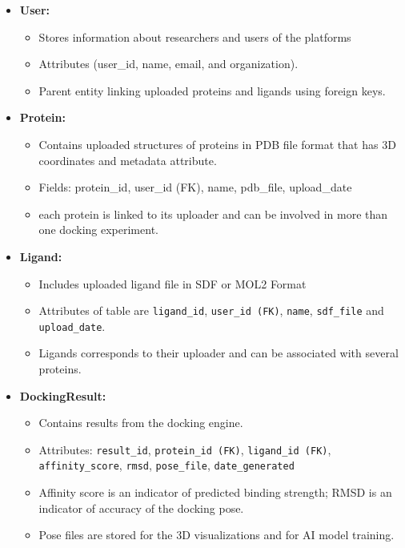 \documentclass[12pt,a4]{report}
\begin{document}
\vspace{0.4cm}
\begin{itemize}
\vspace{0.3cm}
\item \textbf{User:}
\begin{itemize}
\item Stores information about researchers and users of the platforms
\item Attributes (user\_id, name, email, and organization).
\item Parent entity linking uploaded proteins and ligands using foreign keys.
\end{itemize}

\item \textbf{Protein:}
\begin{itemize}
\item Contains uploaded structures of proteins in PDB file format that has 3D coordinates and metadata attribute.
\item Fields: protein\_id, user\_id (FK), name, pdb\_file, upload\_date
\item each protein is linked to its uploader and can be involved in more than one docking experiment.
\end{itemize}

\item \textbf{Ligand:}
\begin{itemize}
\item Includes uploaded ligand file in SDF or MOL2 Format
\item Attributes of table are \texttt{ligand\_id}, \texttt{user\_id (FK)}, \texttt{name}, \texttt{sdf\_file} and \texttt{upload\_date}.
\item Ligands corresponds to their uploader and can be associated with several proteins.
\end{itemize}

\item \textbf{DockingResult:}
\begin{itemize}
\item Contains results from the docking engine.
\item Attributes: \texttt{result\_id}, \texttt{protein\_id (FK)}, \texttt{ligand\_id (FK)}, \texttt{affinity\_score}, \texttt{rmsd}, \texttt{pose\_file}, \texttt{date\_generated}
\item Affinity score is an indicator of predicted binding strength; RMSD is an indicator of accuracy of the docking pose.
\item Pose files are stored for the 3D visualizations and for AI model training.
\end{itemize}


\end{itemize}
\end{document}
